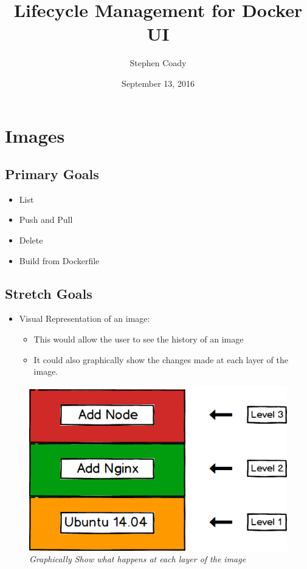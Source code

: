 \documentclass{article}
\author{Stephen Coady}
\title{Lifecycle Management for Docker UI}
\date{September 13, 2016}
\begin{document}
\maketitle
\thispagestyle{empty}
\newpage

\tableofcontents
\newpage

\section{Images}

\subsection{Primary Goals} 
\begin{itemize}
	\item List
	\item Push and Pull
	\item Delete
	\item Build from Dockerfile
\end{itemize} 
\subsection{Stretch Goals}
\begin{itemize}
	\item Visual Representation of an image: 
	\begin{itemize}
		\item This would allow the user to see the history of an image
		\item It could also graphically show the changes made at each layer of the image. 
	\end{itemize}
\end{itemize}

\begin{figure}[!hb]
\centering
\includegraphics*[width=.5\textwidth]{components/docker_image_levels}
\caption{\em Graphically Show what happens at each layer of the image}
\label{fig:docker_image_levels}
\end{figure}
\end{document}
